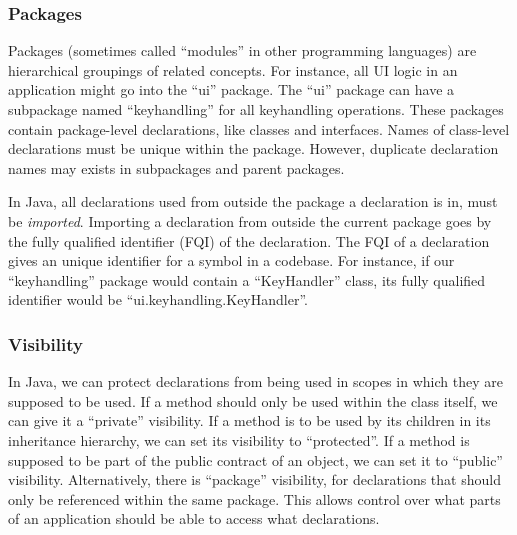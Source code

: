 \subsubsection{Packages}
Packages (sometimes called ``modules'' in other programming languages) are hierarchical groupings of related concepts. For instance, all UI logic in an application might go into the ``ui'' package. The ``ui'' package can have a subpackage named ``keyhandling'' for all keyhandling operations. These packages contain package-level declarations, like classes and interfaces. Names of class-level declarations must be unique within the package. However, duplicate declaration names may exists in subpackages and parent packages.

In Java, all declarations used from outside the package a declaration is in, must be \textit{imported}. Importing a declaration from outside the current package goes by the fully qualified identifier (FQI) of the declaration. The FQI of a declaration gives an unique identifier for a symbol in a codebase. For instance, if our ``keyhandling'' package would contain a ``KeyHandler'' class, its fully qualified identifier would be ``ui.keyhandling.KeyHandler''.

\subsubsection{Visibility}
In Java, we can protect declarations from being used in scopes in which they are supposed to be used. If a method should only be used within the class itself, we can give it a ``private'' visibility. If a method is to be used by its children in its inheritance hierarchy, we can set its visibility to ``protected''. If a method is supposed to be part of the public contract of an object, we can set it to ``public'' visibility. Alternatively, there is ``package'' visibility, for declarations that should only be referenced within the same package. This allows control over what parts of an application should be able to access what declarations.
